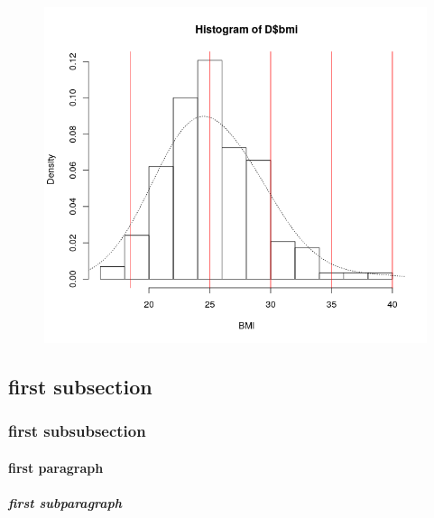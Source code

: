 \documentclass{memoir}
\begin{document}
\begin{figure}[!ht]
	\centering
	\includegraphics[scale=0.74]{histBMI.png}
\end{figure}
\subsection{first subsection}

\subsubsection{first subsubsection}

\paragraph{first paragraph}

\subparagraph{first subparagraph}






%
%
\end{document}
